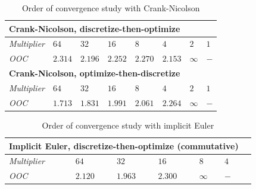 \documentclass[english,a4paper,10pt,oneside]{scrbook}	%
\theoremstyle{break}
\theoremstyle{remark}
\begin{document}
\begin{table}[h]
\centering
\begin{tabular}{llllllll}
\hline
\multicolumn{8}{l}{\textbf{Crank-Nicolson, discretize-then-optimize}} \\ \hline
\textit{Multiplier} & $64$ & $32$ & $16$ & $8$ & $4$ & $2$ & $1$\\ \hline
\textit{OOC} & $2.314$ & $2.196$ & $2.252$ & $2.270$ & $2.153$ & $\infty$ & $-$ \\ \hline
\multicolumn{8}{l}{\textbf{Crank-Nicolson, optimize-then-discretize}} \\ \hline
\textit{Multiplier} & $64$ & $32$ & $16$ & $8$ & $4$ & $2$ & $1$\\ \hline
\textit{OOC} & $1.713$ & $1.831$ & $1.991$ & $2.061$ & $2.264$ & $\infty$ & $-$ \\ \hline
\end{tabular}
\caption{Order of convergence study with Crank-Nicolson}\label{tab:ooc_CN}
\end{table}


\begin{table}[h]
\centering
\begin{tabular}{lllllll}
\hline
\multicolumn{6}{l}{\textbf{Implicit Euler, discretize-then-optimize (commutative)}} \\ \hline
\textit{Multiplier} & $64$ & $32$ & $16$ & $8$ & $4$\\ \hline
\textit{OOC} & $2.120$ & $1.963$ & $2.300$ & $\infty$ & $-$ \\ \hline
\end{tabular}
\caption{Order of convergence study with implicit Euler}\label{tab:ooc_IE}
\end{table}
\end{document}
